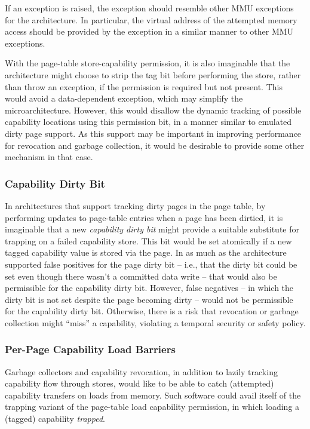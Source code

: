 \begin{description}
If an exception is raised, the exception should resemble other MMU
exceptions for the architecture.  In particular, the virtual address
of the attempted memory access should be provided by the exception in
a similar manner to other MMU exceptions.

With the page-table store-capability permission, it is also imaginable that
the architecture might choose to strip the tag bit before performing the
store, rather than throw an exception, if the permission is required but not
present.
This would avoid a data-dependent exception, which may simplify the
microarchitecture.
However, this would disallow the dynamic tracking of possible capability
locations using this permission bit, in a manner similar to emulated dirty
page support.
As this support may be important in improving performance for revocation and
garbage collection, it would be desirable to provide some other mechanism in
that case.
\end{description}

\subsubsection{Capability Dirty Bit}

In architectures that support tracking dirty pages in the page table, by
performing updates to page-table entries when a page has been dirtied, it is
imaginable that a new \textit{capability dirty bit} might provide a suitable
substitute for trapping on a failed capability store.
This bit would be set atomically if a new tagged capability value is stored
via the page.
In as much as the architecture supported false positives for the page dirty
bit -- i.e., that the dirty bit could be set even though there wasn't a
committed data write -- that would also be permissible for the capability
dirty bit.
However, false negatives -- in which the dirty bit is not set despite the
page becoming dirty -- would not be permissible for the capability dirty bit.
Otherwise, there is a risk that revocation or garbage collection might
``miss'' a capability, violating a temporal security or safety policy.

\subsubsection{Per-Page Capability Load Barriers}
\label{section:capability-load-barriers}

Garbage collectors and capability revocation, in addition to lazily tracking
capability flow through stores, would like to be able to catch (attempted)
capability transfers on loads from memory.  Such software could avail itself of
the trapping variant of the page-table load capability permission, in
which loading a (tagged) capability \emph{trapped}.

